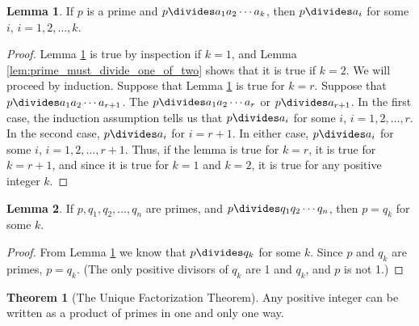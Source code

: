 \documentclass{article}
\theoremstyle{definition} %
\newtheorem{theorem}{Theorem}[section] %
\theoremstyle{definition}
\theoremstyle{definition}
\newtheorem{lemma}{Lemma}[section]
\theoremstyle{definition}
\begin{document}
  \begin{lemma}
    If $p$ is a prime and $p \divides a_1a_2\cdots a_k$, then $p \divides a_i$ for some $i$, $i = 1, 2, \dots, k$.
    \label{lem:prime_must_divide_one_of_them_k}
  \end{lemma}
  
  \begin{proof}
    Lemma \ref{lem:prime_must_divide_one_of_them_k} is true by inspection if $k = 1$, and
    Lemma \ref{lem:prime_must_divide_one_of_two} shows that it is true if $k = 2$. We will proceed by induction.
    Suppose that Lemma \ref{lem:prime_must_divide_one_of_them_k} is true for $k = r$. Suppose that
    $p \divides a_1a_2\cdots a_{r+1}$. The $p \divides a_1a_2\cdots a_r$ or $p \divides a_{r + 1}$. In the
    first case, the induction assumption tells us that $p \divides a_i$ for some $i$, $i = 1, 2, \dots, r$. In the
    second case, $p \divides a_i$ for $i = r + 1$. In either case, $p \divides a_i$ for some $i$, $i =1, 2, \dots, r + 1$.
    Thus, if the lemma is true for $k = r$, it is true for $k = r + 1$, and since it is true for $k = 1$ and $k = 2$, it is
    true for any positive integer $k$.
  \end{proof}
  
  \begin{lemma}
    If $p, q_1, q_2, \dots, q_n$ are primes, and $p \divides q_1q_2\cdots q_n$, then $p = q_k$ for some $k$.
    \label{lem:prime_must_be_one_of_them}
  \end{lemma}
  
  \begin{proof}
    From Lemma \ref{lem:prime_must_divide_one_of_them_k} we know that $p \divides q_k$ for some $k$.
    Since $p$ and $q_k$ are primes, $p = q_k$. (The only positive divisors of $q_k$ are 1 and $q_k$, and
    $p$ is not 1.)
  \end{proof}
  
  \begin{theorem}[The Unique Factorization Theorem]
    Any positive integer can be written as a product of primes in one and only one way.
  \end{theorem}
  
\end{document}
